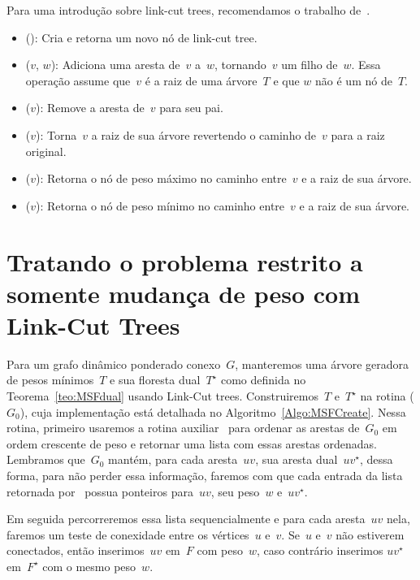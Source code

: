 Para uma introdução sobre link-cut trees, recomendamos o trabalho de~\cite{linkcuttree}.

\begin{itemize}
\item \linkcutCreate(): Cria e retorna um novo nó de link-cut tree.
\item \linkcutAddEdge($v$, $w$): Adiciona uma aresta de~$v$ a~$w$, tornando~$v$ um filho de~$w$. Essa operação assume que~$v$ é a raiz de uma árvore~$T$ e que $w$ não é um nó de~$T$.
\item \linkcutDelEdge($v$): Remove a aresta de~$v$ para seu pai.
\item \linkcutEvert($v$): Torna~$v$ a raiz de sua árvore revertendo o caminho de~$v$ para a raiz original.
\item \linkcutMax($v$): Retorna o nó de peso máximo no caminho entre~$v$ e a raiz de sua árvore.
\item \linkcutMin($v$): Retorna o nó de peso mínimo no caminho entre~$v$ e a raiz de sua árvore.
\end{itemize}



\section{Tratando o problema restrito a somente mudança de peso com Link-Cut Trees}

Para um grafo dinâmico ponderado conexo~$G$, manteremos uma árvore geradora de pesos mínimos~$T$ e sua floresta dual~$T^\star$ como definida no Teorema~\ref{teo:MSFdual} usando Link-Cut trees.
Construiremos~$T$ e~$T^\star$ na rotina \MSFCreate($G_0$), cuja implementação está detalhada no Algoritmo~\ref{Algo:MSFCreate}.
Nessa rotina, primeiro usaremos a rotina auxiliar~\order{} para ordenar as arestas de~$G_0$ em ordem crescente de peso e retornar uma lista com essas arestas ordenadas.
Lembramos que~$G_0$ mantém, para cada aresta~$uv$, sua aresta dual~$uv^\star$, dessa forma, para não perder essa informação, faremos com que cada entrada da lista retornada por~\order{}
possua ponteiros para~$uv$, seu peso~$w$ e~$uv^\star$.



Em seguida percorreremos essa lista sequencialmente e para cada aresta~$uv$ nela, faremos um teste de conexidade entre os vértices~$u$ e~$v$.
Se~$u$ e~$v$ não estiverem conectados, então inserimos~$uv$ em~$F$ com peso~$w$, caso contrário inserimos $uv^\star$ em~$F^\star$ com o mesmo peso~$w$.

